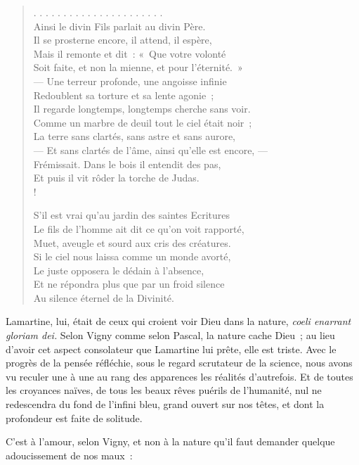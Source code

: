 \documentclass[french,twoside]{book} %
\begin{document}
\begin{verse}
. . . . . . . . . . . . . . . . . . . . . .\\
Ainsi le divin Fils parlait au divin Père.\\
Il se prosterne encore, il attend, il espère,\\
Mais il remonte et dit : « Que votre volonté\\
Soit faite, et non la mienne, et pour l’éternité. »\\
— Une terreur profonde, une angoisse infinie\\
Redoublent sa torture et sa lente agonie ;\\
Il regarde longtemps, longtemps cherche sans voir.\\
Comme un marbre de deuil tout le ciel était noir ;\\
La terre sans clartés, sans astre et sans aurore,\\
— Et sans clartés de l’âme, ainsi qu’elle est encore, —\\
Frémissait. Dans le bois il entendit des pas,\\
Et puis il vit rôder la torche de Judas.\\!

S’il est vrai qu’au jardin des saintes Ecritures\\
Le fils de l’homme ait dit ce qu’on voit rapporté,\\
Muet, aveugle et sourd aux cris des créatures.\\
Si le ciel nous laissa comme un monde avorté,\\
Le juste opposera le dédain à l’absence,\\
Et ne répondra plus que par un froid silence\\
Au silence éternel de la Divinité.\\
\end{verse}

\noindent Lamartine, lui, était de ceux qui croient voir Dieu dans la nature, \emph{coeli enarrant gloriam dei.} Selon Vigny comme selon Pascal, la nature cache Dieu ; au lieu d’avoir cet aspect consolateur que Lamartine lui prête, elle est triste. Avec le progrès de la pensée réfléchie, sous le regard scrutateur de la science, nous avons vu reculer une à une au rang des apparences les réalités d’autrefois. Et de toutes les croyances naïves, de tous les beaux rêves puérils de l’humanité, nul ne redescendra du fond de l’infini bleu, grand ouvert sur nos têtes, et dont la profondeur est faite de solitude.\par
C’est à l’amour, selon Vigny, et non à la nature qu’il faut demander quelque adoucissement de nos maux :\par
\end{document}
